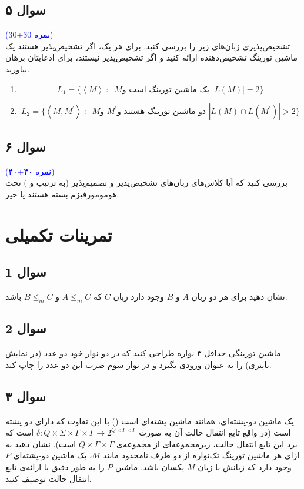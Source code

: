 \documentclass{scribe-or}
\begin{document}
\subsection*{سوال ۵}
\textcolor{blue}{(30+30 نمره)}\\
تشخیص‌پذیری زبان‌های زیر را بررسی کنید. برای هر یک، اگر تشخیص‌پذیر هستند یک ماشین تورینگ تشخیص‌‌دهنده ارائه کنید و اگر تشخیص‌پذیر نیستند، برای ادعایتان برهان بیاورید.
\begin{enumerate}
\item 
$$L_1=\{\left\langle M \right\rangle ~:~ \text{
	$M$
	یک ماشین تورینگ است و 
	$|L(M)|=2$}\}$$
\item 
$$L_2=\{\left\langle M , M^\prime\right\rangle ~:~\text{
	$M$
	و 
	$M^\prime$
	دو ماشین تورینگ هستند و 
	$|L(M)\cap L(M^\prime)|>2$}\}$$
\end{enumerate}
\subsection*{سوال ۶}
\textcolor{blue}{(۴۰+۴۰ نمره)}\\
بررسی کنید که آیا کلاس‌های زبان‌های تشخیص‌پذیر و تصمیم‌پذیر (به ترتیب  و ) تحت هومومورفیزم بسته هستند یا خیر.
\section*{تمرینات تکمیلی}
\subsection*{سوال 1}
نشان دهید برای هر دو زبان $A$ و $B$ وجود دارد زبان $C$ که $A\leq_mC$ و $B\leq_mC$ باشد.
\subsection*{سوال 2}
ماشین تورینگی حداقل ۳ نواره طراحی کنید که در دو نوار خود دو عدد (در نمایش باینری) را به عنوان ورودی بگیرد و در نوار سوم ضرب این دو عدد را چاپ کند. 
\subsection*{ سوال ۳}
یک ماشین دو-پشته‌ای، همانند ماشین پشته‌ای است‌ () با این تفاوت که دارای دو پشته است (در واقع تابع انتقال حالت آن به صورت 
$\delta : Q\times \Sigma \times \Gamma \times \Gamma \rightarrow 2^{Q\times\Gamma \times \Gamma}$
است که برد این تابع انتقال حالت، زیرمجموعه‌ای از مجموعه‌ی 
$Q\times\Gamma \times \Gamma$
است). نشان دهید به ازای هر ماشین تورینگ تک‌نواره از دو طرف نامحدود مانند $M$، یک ماشین دو-پشته‌ای $P$ وجود دارد که زبانش با زبان $M$ یکسان باشد. ماشین $P$ را به طور دقیق با ارائه‌ی تابع انتقال حالت توصیف کنید.
\end{document}
